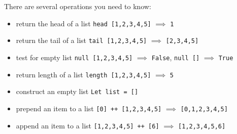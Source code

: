   There are several operations you need to know:
  \begin{itemize}
  	\item return the head of a list
	  	\subitem \verb|head [1,2,3,4,5]| $\implies$ \verb|1|
  	\item return the tail of a list
	  	\subitem \verb|tail [1,2,3,4,5]| $\implies$ \verb|[2,3,4,5]|
  	\item test for empty list
	  	\subitem \verb|null [1,2,3,4,5]| $\implies$ \verb|False|, \verb|null []| $\implies$ \verb|True|
  	\item return length of a list
	  	\subitem \verb|length [1,2,3,4,5]| $\implies$ \verb|5|
  	\item construct an empty list
	  	\subitem \verb|Let list = []|
	\item prepend an item to a list
		\subitem \verb|[0] ++ [1,2,3,4,5]| $\implies$ \verb|[0,1,2,3,4,5]|
	\item append an item to a list
		\subitem \verb|[1,2,3,4,5] ++ [6]| $\implies$ \verb|[1,2,3,4,5,6]|
  \end{itemize}